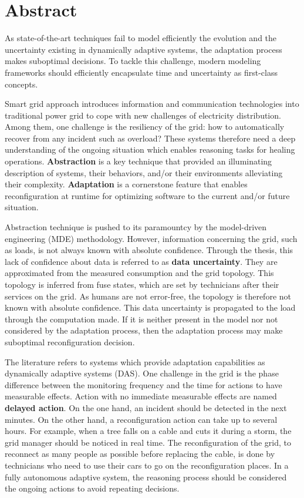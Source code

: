 \chapter*{Abstract}

{
	As state-of-the-art techniques fail to model efficiently the evolution and the uncertainty existing in dynamically adaptive systems, the adaptation process makes suboptimal decisions.
	To tackle this challenge, modern modeling frameworks should efficiently encapsulate time and uncertainty as first-class concepts.
}
\bigskip

Smart grid approach introduces information and communication technologies into traditional power grid to cope with new challenges of electricity distribution.
Among them, one challenge is the resiliency of the grid: how to automatically recover from any incident such as overload?
These systems therefore need a deep understanding of the ongoing situation which enables reasoning tasks for healing operations.
\textbf{Abstraction} is a key technique that provided an illuminating description of systems, their behaviors, and/or their environments alleviating their complexity.
\textbf{Adaptation} is a cornerstone feature that enables reconfiguration at runtime for optimizing software to the current and/or future situation.

Abstraction technique is pushed to its paramountcy by the model-driven engineering (MDE) methodology.
However, information concerning the grid, such as loads, is not always known with absolute confidence.
Through the thesis, this lack of confidence about data is referred to as \textbf{data uncertainty}.
They are approximated from the measured consumption and the grid topology.
This topology is inferred from fuse states, which are set by technicians after their services on the grid.
As humans are not error-free, the topology is therefore not known with absolute confidence.
This data uncertainty is propagated to the load through the computation made.
If it is neither present in the model nor not considered by the adaptation process, then the adaptation process may make suboptimal reconfiguration decision.

The literature refers to systems which provide adaptation capabilities as dynamically adaptive systems (DAS).
One challenge in the grid is the phase difference between the monitoring frequency and the time for actions to have measurable effects.
Action with no immediate measurable effects are named \textbf{delayed action}.
On the one hand, an incident should be detected in the next minutes.
On the other hand, a reconfiguration action can take up to several hours.
For example, when a tree falls on a cable and cuts it during a storm, the grid manager should be noticed in real time.
The reconfiguration of the grid, to reconnect as many people as possible before replacing the cable, is done by technicians who need to use their cars to go on the reconfiguration places.
In a fully autonomous adaptive system, the reasoning process should be considered the ongoing actions to avoid repeating decisions.

